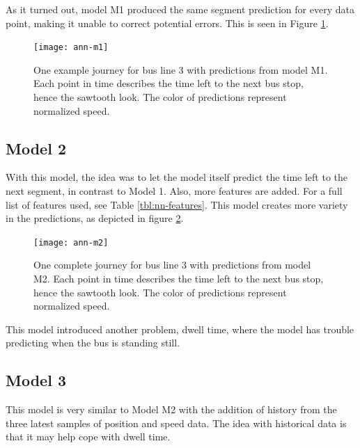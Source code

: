 As it turned out, model M1 produced the same segment prediction for every data point, making it unable to correct potential errors. This is seen in Figure \ref{fig:ann-m1}.

\begin{figure}[h]
  \begin{minipage}{\textwidth}
    \begin{adjustbox}{center}
      \texttt{[image: ann-m1]}
    \end{adjustbox}  
      \caption{One example journey for bus line 3 with predictions from model M1. Each point in time describes the time left to the next bus stop, hence the sawtooth look. The color of predictions represent normalized speed.}
      \label{fig:ann-m1}      
    \end{minipage}
\end{figure}


\subsection{Model 2}\label{M2}
With this model, the idea was to let the model itself predict the time left to the next segment, in contrast to Model 1. Also, more features are added. For a full list of features used, see Table \ref{tbl:nn-features}. This model creates more variety in the predictions, as depicted in figure \ref{fig:ann-m2}.


\begin{figure}[h]
  \begin{minipage}{\textwidth}
    \begin{adjustbox}{center}
      \texttt{[image: ann-m2]}
    \end{adjustbox}  
      \caption{One complete journey for bus line 3 with predictions from model M2. Each point in time describes the time left to the next bus stop, hence the sawtooth look. The color of predictions represent normalized speed.}
      \label{fig:ann-m2}      
    \end{minipage}
\end{figure}

This model introduced another problem, dwell time, where the model has trouble predicting when the bus is standing still. 

\subsection{Model 3}\label{M3}
This model is very similar to Model M2 with the addition of history from the three latest samples of position and speed data. The idea with historical data is that it may help cope with dwell time.

